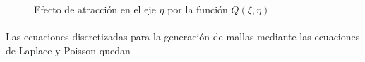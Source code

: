 \documentclass[letterpaper, openright, 12pt]{book}
\begin{document}
    \begin{figure}[htbp!]
        \centering
        \hspace{1cm}
        \caption[Efecto de atracción por función $Q(\xi,\eta)$]{Efecto de
        atracción en el eje $\eta$ por la función $Q(\xi, \eta)$}
        \label{fig:densidad-eta}
    \end{figure}

    \paragraph*{}
    Las ecuaciones discretizadas para la generación de mallas mediante las
    ecuaciones de Laplace y Poisson quedan
\end{document}
